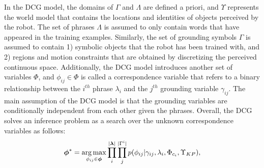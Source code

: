 In the DCG model, the domains of $\Gamma$ and $\Lambda$ are defined a priori, and $\Upsilon$ represents the world model that contains the locations and identities of objects perceived by the robot. %
The set of phrases $\Lambda$ is assumed to only contain words that have appeared in the training examples. Similarly, the set of grounding symbols $\Gamma$ is assumed to contain 1) symbolic objects that the robot has been trained with, and 2) regions and motion constraints that are obtained by discretizing the perceived continuous space.  Additionally, the DCG model introduces another set of variables $\Phi$, and $\phi_{ij} \in \Phi$ is called a correspondence variable that refers to a binary relationship between the $i^{th}$ phrase $\lambda_i$ and the $j^{th}$ grounding variable $\gamma_{ij}$. The main assumption of the DCG model is that the grounding variables are conditionally independent from each other given the phrases. Overall, the DCG solves an inference problem as a search over the unknown correspondence variables as follows:  
\begin{equation}
\label{eq:dcg_factored1}
\begin{split}
\boldsymbol{\phi}^* = \operatorname*{\arg\max}_{\phi_{ij} \in \boldsymbol{\phi}} \prod_{i}^{| \boldsymbol{\lambda}|} \prod_{j}^{|\Gamma^i|} p(\phi_{ij}|\gamma_{ij},\lambda_i, \Phi_{c_{i}}, \Upsilon_{KP}),
\end{split}
\end{equation}
